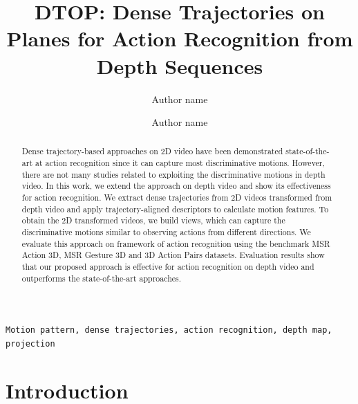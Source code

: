 \documentclass[final,3p,times,twocolumn]{elsarticle}
\begin{document}
\begin{frontmatter}

\title{DTOP: Dense Trajectories on Planes for Action Recognition from Depth Sequences}

%
%
%
%

\author{Author name}
\address{Work address}

\author{Author name}
\address{Work address}

\begin{abstract}
Dense trajectory-based approaches on 2D video have been demonstrated state-of-the-art at action recognition since it can capture most discriminative motions.
However, there are not many studies related to exploiting the discriminative motions in depth video.
In this work, we extend the approach on depth video and show its effectiveness for action recognition.
We extract dense trajectories from 2D videos transformed from depth video and apply trajectory-aligned descriptors to calculate motion features.
To obtain the 2D transformed videos, we build views, which can capture the discriminative motions similar to observing actions from different directions.
We evaluate this approach on framework of action recognition using the benchmark MSR Action 3D, MSR Gesture 3D and 3D Action Pairs datasets.
Evaluation results show that our proposed approach is effective for action recognition on depth video and outperforms the state-of-the-art approaches.
\end{abstract}

\begin{keyword}
\texttt{Motion pattern, dense trajectories, action recognition, depth map, projection}
\end{keyword}

\end{frontmatter}

\linenumbers

\section{Introduction}
\end{document}
